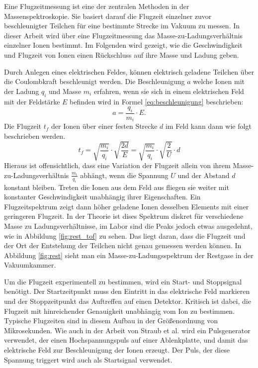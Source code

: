 Eine Flugzeitmessung ist eine der zentralen Methoden in der Massenspektroskopie. Sie basiert darauf die Flugzeit einzelner zuvor beschleunigter Teilchen für eine bestimmte Strecke im Vakuum zu messen. In dieser Arbeit wird über eine Flugzeitmessung das Masse-zu-Ladungsverhältnis einzelner Ionen bestimmt. Im Folgenden wird gezeigt, wie die Geschwindigkeit und Flugzeit von Ionen einen Rückschluss auf ihre Masse und Ladung geben.

Durch Anlegen eines elektrischen Feldes, können elektrisch geladene Teilchen über die Coulombkraft beschleunigt werden. Die Beschleunigung $a$ welche Ionen mit der Ladung $q_i$ und Masse $m_i$ erfahren, wenn sie sich in einem elektrischen Feld mit der Feldstärke $E$ befinden wird in Formel \ref{eq:beschleunigung} beschrieben: 
\begin{equation}
    \label{eq:beschleunigung}
    a = \frac{q_i}{m_i} \cdot E.
\end{equation}
Die Flugzeit $t_f$ der Ionen über einer festen Strecke $d$ im Feld kann dann wie folgt beschrieben werden.
\begin{equation}
    t_f = \sqrt{\frac{m_i}{q_i}} \cdot \sqrt{\frac{2d}{E}} = \sqrt{\frac{m_i}{q_i}} \cdot \sqrt{\frac{2}{U}} \cdot d
\end{equation}
Hieraus ist offensichtlich, dass eine Variation der Flugzeit allein von ihrem Masse-zu-Ladungsverhältnis $\frac{m_i}{q_i}$ abhängt, wenn die Spannung $U$ und der Abstand $d$ konstant bleiben. Treten die Ionen aus dem Feld aus fliegen sie weiter mit konstanter Geschwindigkeit unabhängig ihrer Eigenschaften. Ein Flugzeitspektrum zeigt dann höher geladene Ionen desselben Elements mit einer geringeren Flugzeit. In der Theorie ist dises Spektrum diskret für verschiedene Masse zu Ladungsverhältnisse, im Labor sind die Peaks jedoch etwas ausgedehnt, wie in Abbildung \ref{fig:rest_tof} zu sehen. Das liegt daran, dass die Flugzeit und der Ort der Entstehung der Teilchen nicht genau gemessen werden können. In Abbildung \ref{fig:rest} sieht man ein Masse-zu-Ladungsspektrum der Restgase in der Vakuumkammer. 

Um die Flugzeit experimentell zu bestimmen, wird ein Start- und Stoppsignal benötigt. Der Startzeitpunkt muss den Eintritt in das elektrische Feld markieren und der Stoppzeitpunkt das Auftreffen auf einen Detektor. Kritisch ist dabei, die Flugzeit mit hinreichender Genauigkeit unabhängig vom Ion zu bestimmen. Typische Flugzeiten sind in diesem Aufbau in der Größenordnung von Mikrosekunden. Wie auch in der Arbeit von Straub et al. wird ein Pulsgenerator verwendet, der einen Hochspannungspuls auf einer Ablenkplatte, und damit das elektrische Feld zur Beschleunigung der Ionen erzeugt. Der Puls, der diese Spannung triggert wird auch als Startsignal verwendet.

